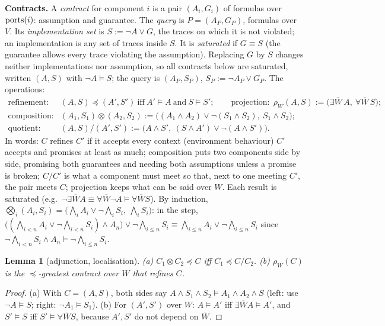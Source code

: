 \documentclass[10pt]{article}
\theoremstyle{tplain}\newtheorem{theorem}{Theorem}\newtheorem{lemma}[theorem]{Lemma}\newtheorem{proposition}[theorem]{Proposition}\newtheorem{corollary}[theorem]{Corollary}
\theoremstyle{tdef}\newtheorem{definition}[theorem]{Definition}
\newcommand{\hid}[1]{\overline{#1}}
\begin{document}
\textbf{Contracts.} A \emph{contract} for component $i$ is a pair $(A_i,G_i)$ of formulas over $\mathrm{ports}(i)$: assumption and guarantee. The \emph{query} is $P=(A_P,G_P)$, formulas over $V$. Its \emph{implementation set} is $S:=\neg A\vee G$, the traces on which it is not violated; an implementation is any set of traces inside $S$. It is \emph{saturated} if $G\equiv S$ (the guarantee allows every trace violating the assumption). Replacing $G$ by $S$ changes neither implementations nor assumption, so all contracts below are saturated, written $(A,S)$ with $\neg A\models S$; the query is $(A_P,S_P)$, $S_P:=\neg A_P\vee G_P$. The operations:
\[\begin{array}{ll}
\text{refinement:} & (A,S)\preccurlyeq(A',S')\ \text{iff}\ A'\models A\ \text{and}\ S\models S';\qquad\text{projection:}\ \ \rho_W(A,S):=\big(\exists\hid W\,A,\ \forall\hid W\,S\big);\\
\text{composition:} & (A_1,S_1)\otimes(A_2,S_2):=\big((A_1\wedge A_2)\vee\neg(S_1\wedge S_2),\ S_1\wedge S_2\big);\\
\text{quotient:} & (A,S)/(A',S'):=\big(A\wedge S',\ (S\wedge A')\vee\neg(A\wedge S')\big).
\end{array}\]
In words: $C$ refines $C'$ if it accepts every context (environment behaviour) $C'$ accepts and promises at least as much; composition puts two components side by side, promising both guarantees and needing both assumptions unless a promise is broken; $C/C'$ is what a component must meet so that, next to one meeting $C'$, the pair meets $C$; projection keeps what can be said over $W$. Each result is saturated (e.g.\ $\neg\exists\hid WA\equiv\forall\hid W\neg A\models\forall\hid WS$). By induction, $\bigotimes_{i}(A_i,S_i)=\big(\bigwedge_iA_i\vee\neg\bigwedge_iS_i,\ \bigwedge_iS_i\big)$: in the step, $\big((\bigwedge_{i<n}A_i\vee\neg\bigwedge_{i<n}S_i)\wedge A_n\big)\vee\neg\bigwedge_{i\le n}S_i\equiv\bigwedge_{i\le n}A_i\vee\neg\bigwedge_{i\le n}S_i$ since $\neg\bigwedge_{i<n}S_i\wedge A_n\models\neg\bigwedge_{i\le n}S_i$.
\begin{lemma}[adjunction, localisation]\label{lem:adj}
(a) $C_1\otimes C_2\preccurlyeq C$ iff $C_1\preccurlyeq C/C_2$. (b) $\rho_W(C)$ is the $\preccurlyeq$-greatest contract over $W$ that refines $C$.
\end{lemma}
\begin{proof}
(a) With $C=(A,S)$, both sides say $A\wedge S_1\wedge S_2\models A_1\wedge A_2\wedge S$ (left: use $\neg A\models S$; right: $\neg A_1\models S_1$). (b) For $(A',S')$ over $W$: $A\models A'$ iff $\exists\hid WA\models A'$, and $S'\models S$ iff $S'\models\forall\hid WS$, because $A',S'$ do not depend on $\hid W$.
\end{proof}
\end{document}
